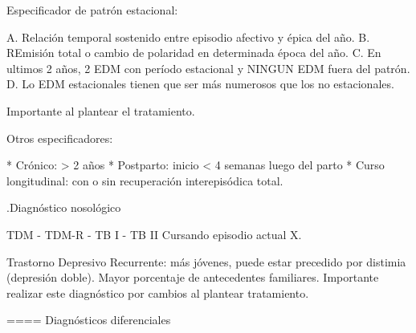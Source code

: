 Especificador de patrón estacional:

A. Relación temporal sostenido entre episodio afectivo y épica del año.
B. REmisión total o cambio de polaridad en determinada época del año.
C. En ultimos 2 años, 2 EDM con período estacional y NINGUN EDM fuera del patrón.
D. Lo EDM estacionales tienen que ser más numerosos que los no estacionales.

Importante al plantear el tratamiento.

Otros especificadores:

* Crónico: > 2 años
* Postparto: inicio < 4 semanas luego del parto
* Curso longitudinal: con o sin recuperación interepisódica total.

.Diagnóstico nosológico

TDM - TDM-R - TB I - TB II
Cursando episodio actual X.

Trastorno Depresivo Recurrente: más jóvenes, puede estar precedido por distimia (depresión doble). Mayor porcentaje de antecedentes familiares. Importante realizar este diagnóstico por cambios al plantear tratamiento.

==== Diagnósticos diferenciales

